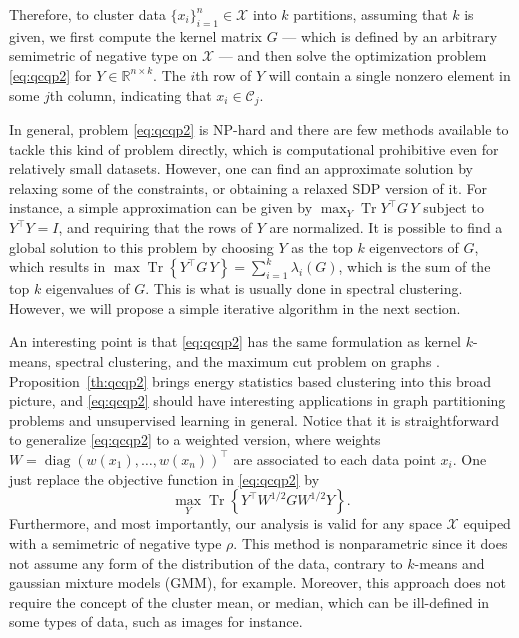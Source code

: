 \documentclass{article}
\DeclareMathOperator{\diag}{diag}
\DeclareMathOperator{\Tr}{Tr}
\newcommand\C{{\mathcal{C}}}
\newcommand\Zt{Y}
\begin{document}
Therefore, to cluster data $\{ x_i \}_{i=1}^n \in \mathcal{X}$ into 
$k$ partitions,
assuming that $k$ is given, we first compute the kernel matrix
$G$  --- 
which is  defined by an arbitrary semimetric of negative 
type on $\mathcal{X}$  --- and then 
solve the optimization problem \eqref{eq:qcqp2} for $\Zt \in
\mathbb{R}^{n\times k}$. The $i$th row
of $\Zt$ will contain a single nonzero element in some $j$th column,
indicating that $x_i \in \C_j$.

In general, 
problem \eqref{eq:qcqp2} is NP-hard and there
are few methods
available to tackle this kind of problem directly,
which is computational prohibitive even for relatively small datasets.
However, one can find an approximate solution by relaxing some 
of the constraints, or obtaining a relaxed SDP version of it. 
For instance, a simple approximation can be given
by 
$\max_{Y} \Tr Y^\top G \, Y $ subject to $Y^\top Y = I$,
and requiring that the rows of $Y$ are normalized. 
It is possible to find a global solution to this problem by
choosing $Y$ as the top $k$ eigenvectors of $G$, which results
in 
$\max \Tr \left\{ Y^\top G \, Y \right\}  = \sum_{i=1}^k \lambda_i(G)$, 
which is the
sum of the top $k$ eigenvalues of $G$. This is what is usually done
in spectral clustering. However, we will propose a simple iterative
algorithm in the next section.

An interesting point is that \eqref{eq:qcqp2} has the same
formulation as kernel $k$-means, spectral clustering, and the maximum
cut problem on graphs \cite{Dhillon}. 
Proposition~\ref{th:qcqp2} brings energy statistics based clustering
into this broad picture, and \eqref{eq:qcqp2} should have 
interesting applications in
graph partitioning problems and unsupervised learning in general.
Notice that it is straightforward to generalize \eqref{eq:qcqp2} to
a weighted version, where weights $W = \diag(w(x_1), \dotsc, w(x_n))^\top $
are associated to each data point $x_i$. One just replace the objective
function in \eqref{eq:qcqp2} by 
\begin{equation}
\max_Y \Tr \left\{ Y^\top W^{1/2} G W^{1/2} Y \right\}.
\end{equation}
Furthermore, and most importantly, our analysis is valid
for any space $\mathcal{X}$ equiped with a semimetric of negative type $\rho$.
This method is
nonparametric since it does not assume any form of the 
distribution of the data,
contrary to $k$-means and gaussian mixture models (GMM), for example.
Moreover, this approach does not require the concept of the cluster mean, or
median, which can be ill-defined in some types of data, such as images for
instance.
\end{document}
